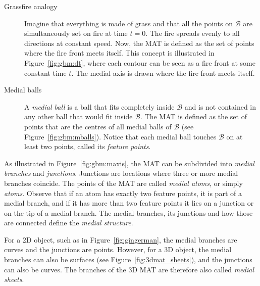 \begin{description}
	\item[Grassfire analogy]
	Imagine that everything is made of grass and that all the points on $\mathcal{B}$ are simultaneously set on fire at time $t=0$. 
	The fire spreads evenly to all directions at constant speed. 
	Now, the MAT is defined as the set of points where the fire front meets itself. 
	This concept is illustrated in Figure~\ref{fig:gbm:dt}, where each contour can be seen as a fire front at some constant time $t$. The medial axis is drawn where the fire front meets itself.
	\item[Medial balls]
	A \emph{medial ball} is a ball that fits completely inside $\mathcal{B}$ and is not contained in any other ball that would fit inside $\mathcal{B}$. 
	The MAT is defined as the set of points that are the centres of all medial balls of $\mathcal{B}$ (see Figure~\ref{fig:gbm:mballs}). 
	Notice that each medial ball touches $\mathcal{B}$ on at least two points, called its \emph{feature points}. 
\end{description}

As illustrated in Figure~\ref{fig:gbm:maxis}, the MAT can be subdivided into \emph{medial branches} and \emph{junctions}. 
Junctions are locations where three or more medial branches coincide. 
The points of the MAT are called \emph{medial atoms}, or simply \emph{atoms}. 
Observe that if an atom has exactly two feature points, it is part of a medial branch, and if it has more than two feature points it lies on a junction or on the tip of a medial branch. 
The medial branches, its junctions and how those are connected define the \emph{medial structure}.

For a 2D object, such as in Figure~\ref{fig:gingerman}, the medial branches are curves and the junctions are points. 
However, for a 3D object, the medial branches can also be surfaces (see Figure~\ref{fig:3dmat_sheets}), and the junctions can also be curves.
The branches of the 3D MAT are therefore also called \emph{medial sheets}.


